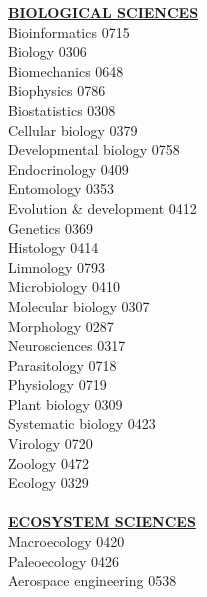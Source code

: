 \documentclass[9pt,twoside]{article}
\newcommand{\categoryheading}[1]{{\fontsize{8}{11}\selectfont \textbf{\uline{#1}}}}
\begin{document}
\begin{multicols}{3}
\categoryheading{BIOLOGICAL SCIENCES} \\
Bioinformatics \hfill 0715 \\
Biology \hfill 0306 \\
Biomechanics \hfill 0648 \\
Biophysics \hfill 0786 \\
Biostatistics \hfill 0308 \\
Cellular biology \hfill 0379 \\
Developmental biology \hfill 0758 \\
Endocrinology \hfill 0409 \\
Entomology \hfill 0353 \\
Evolution \& development \hfill 0412 \\
Genetics \hfill 0369 \\
Histology \hfill 0414 \\
Limnology \hfill 0793 \\
Microbiology \hfill 0410 \\
Molecular biology \hfill 0307 \\
Morphology \hfill 0287 \\
Neurosciences \hfill 0317 \\
Parasitology \hfill 0718 \\
Physiology \hfill 0719 \\
Plant biology \hfill 0309 \\
Systematic biology \hfill 0423 \\
Virology \hfill 0720 \\
Zoology \hfill 0472 \\
Ecology \hfill 0329 \\
\columnbreak \\
\categoryheading{ECOSYSTEM SCIENCES} \\
Macroecology \hfill 0420 \\
Paleoecology \hfill 0426 \\
Aerospace engineering \hfill 0538


\end{multicols}
\end{document}
